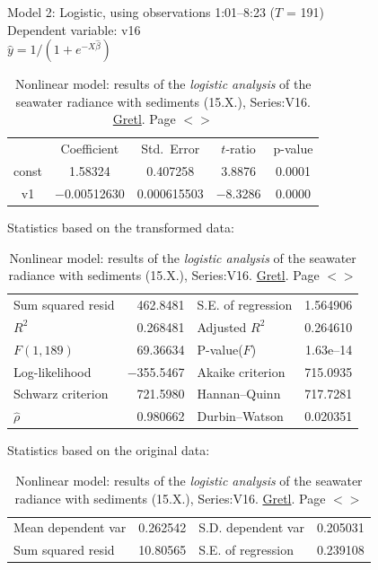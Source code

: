 \documentclass[11pt]{article}
\begin{document}
\begin{appendices}
\begin{table}
	\caption{Nonlinear model: results of the \textit{logistic analysis} of the seawater radiance with sediments (15.X.), Series:V16. \href{http://gretl.sourceforge.net/}{Gretl}. Page $<$\pageref{page-41}$>$}
	\begin{center}
	Model 2: Logistic, using observations 1:01--8:23 ($T$ = 191)\\
	Dependent variable: v16\\
	$\hat{y} = 1 / (1 + e^{-X\hat{\beta}})$
	
	\vspace{1em}
	\begin{tabular}{|c|c|c|c|c|}
		  & {Coefficient} & {Std.\ Error} & {$t$-ratio} & {p-value} \\[1ex]
		const &  1.58324 &     0.407258 &       3.8876 &         0.0001 \\
		v1 &   $-$0.00512630 &     0.000615503 &       $-$8.3286 &         0.0000 \\
	\end{tabular}

	\vspace{1em}Statistics based on the transformed data:

	\vspace{1ex}
	\begin{tabular}{lrlr}
		Sum squared resid &  462.8481 & S.E. of regression &  1.564906 \\
		$R^2$ &  0.268481 & Adjusted $R^2$ &  0.264610 \\
		$F(1, 189)$ &  69.36634 & P-value($F$) &  1.63\textrm{e--14} \\
		Log-likelihood & $-$355.5467 & Akaike criterion &  715.0935 \\
		Schwarz criterion &  721.5980 & Hannan--Quinn &  717.7281 \\
		$\hat{\rho}$ &  0.980662 & Durbin--Watson &  0.020351 \\
	\end{tabular}

	\vspace{1em}Statistics based on the original data:

	\vspace{1ex}
	\begin{tabular}{lrlr}
		Mean dependent var &  0.262542 & S.D. dependent var &  0.205031 \\
		Sum squared resid &  10.80565 & S.E. of regression &  0.239108 \\
	\end{tabular}
	\end{center}
	\label{tab:11}
\end{table}


\end{appendices}
\end{document}
